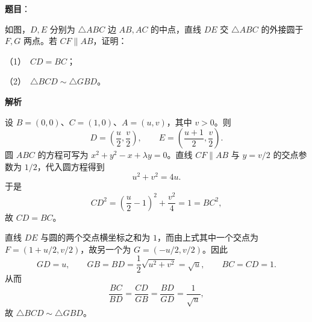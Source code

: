 \begin{answer}

\textbf{题目}：

如图，$D,E$ 分别为 $\triangle ABC$ 边 $AB,AC$ 的中点，直线 $DE$ 交 $\triangle ABC$ 的外接圆于 $F,G$ 两点。若 $CF\parallel AB$，证明：

（1）　$CD=BC$；

（2）　$\triangle BCD\sim\triangle GBD$。
\nopagebreak[4]
\begin{center}\end{center}
\nopagebreak[4]
\textbf{解析}


设 $B=(0,0)$、$C=(1,0)$、$A=(u,v)$，其中 $v>0$。则
\nopagebreak[4]
\[
D=\left(\frac u2,\frac v2\right),\qquad E=\left(\frac{u+1}2,\frac v2\right).
\]
圆 $ABC$ 的方程可写为 $x^2+y^2-x+\lambda y=0$。直线 $CF\parallel AB$ 与 $y=v/2$ 的交点参数为 $1/2$，代入圆方程得到
\nopagebreak[4]
\[
u^2+v^2=4u.
\]
于是
\nopagebreak[4]
\[
CD^2=\left(\frac u2-1\right)^2+\frac{v^2}{4}=1=BC^2,
\]
故 $CD=BC$。


直线 $DE$ 与圆的两个交点横坐标之和为 $1$，而由上式其中一个交点为 $F=(1+u/2,v/2)$，故另一个为 $G=(-u/2,v/2)$。因此
\nopagebreak[4]
\[
GD=u,\qquad GB=BD=\frac12\sqrt{u^2+v^2}=\sqrt u,\qquad BC=CD=1.
\]
从而
\nopagebreak[4]
\[
\frac{BC}{BD}=\frac{CD}{GB}=\frac{BD}{GD}=\frac1{\sqrt u},
\]
故 $\triangle BCD\sim\triangle GBD$。



\end{answer}
